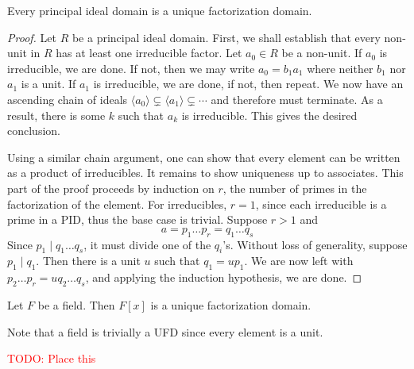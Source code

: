 \begin{theorem}
    Every principal ideal domain is a unique factorization domain.
\end{theorem}
\begin{proof}
    Let $R$ be a principal ideal domain. First, we shall establish that every non-unit in $R$ has at least one irreducible factor. Let $a_0\in R$ be a non-unit. If $a_0$ is irreducible, we are done. If not, then we may write $a_0 = b_1a_1$ where neither $b_1$ nor $a_1$ is a unit. If $a_1$ is irreducible, we are done, if not, then repeat. We now have an ascending chain of ideals $\langle a_0\rangle\subsetneq\langle a_1\rangle\subsetneq\cdots$ and therefore must terminate. As a result, there is some $k$ such that $a_k$ is irreducible. This gives the desired conclusion.

    Using a similar chain argument, one can show that every element can be written as a product of irreducibles. It remains to show uniqueness up to associates. This part of the proof proceeds by induction on $r$, the number of primes in the factorization of the element. For irreducibles, $r = 1$, since each irreducible is a prime in a PID, thus the base case is trivial. Suppose $r > 1$ and 
    \begin{equation*}
        a = p_1\ldots p_r = q_1\ldots q_s
    \end{equation*}
    Since $p_1\mid q_1\ldots q_s$, it must divide one of the $q_i$'s. Without loss of generality, suppose $p_1\mid q_1$. Then there is a unit $u$ such that $q_1 = up_1$. We are now left with $p_2\ldots p_r = uq_2\ldots q_s$, and applying the induction hypothesis, we are done.
\end{proof}

\begin{corollary}
    Let $F$ be a field. Then $F[x]$ is a unique factorization domain.
\end{corollary}

Note that a field is trivially a UFD since every element is a unit.


\hrulefill 

\textcolor{red}{TODO: Place this}

